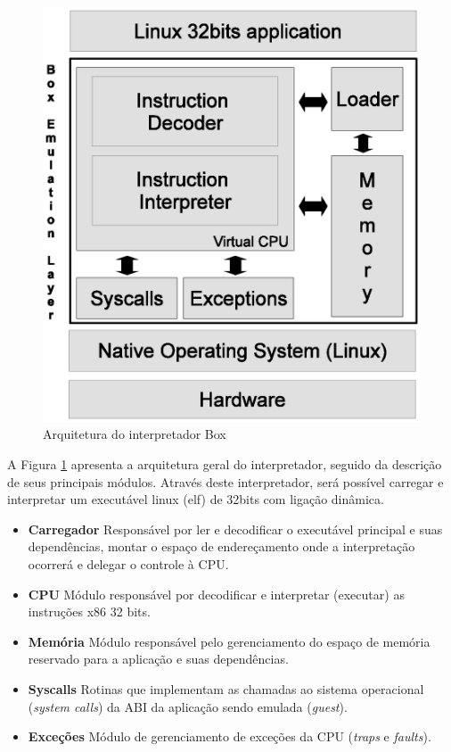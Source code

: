 \documentclass[11pt,twoside]{article}
\begin{document}
\begin{figure}[h]
 \centering
 \includegraphics[width=0.5\columnwidth]{./figures/box-architecture.eps}
 \caption{Arquitetura do interpretador Box}
 \label{fig:box-architecture}
\end{figure}

A Figura \ref{fig:box-architecture} apresenta a arquitetura geral do interpretador, seguido da descrição de seus principais módulos.
Através deste interpretador, será possível carregar e interpretar um executável linux (elf) de 32bits com ligação dinâmica.

\begin{itemize}
 \item \textbf{Carregador} Responsável por ler e decodificar o executável principal e suas dependências, montar o espaço de endereçamento onde a interpretação ocorrerá e delegar o controle à CPU.
 \item \textbf{CPU} Módulo responsável por decodificar e interpretar (executar) as instruções x86 32 bits.
 \item \textbf{Memória} Módulo responsável pelo gerenciamento do espaço de memória reservado para a aplicação e suas dependências.
 \item \textbf{Syscalls} Rotinas que implementam as chamadas ao sistema operacional (\emph{system calls}) da ABI da aplicação sendo emulada (\emph{guest}).
 \item \textbf{Exceções} Módulo de gerenciamento de exceções da CPU (\emph{traps} e \emph{faults}).
\end{itemize}
\end{document}
